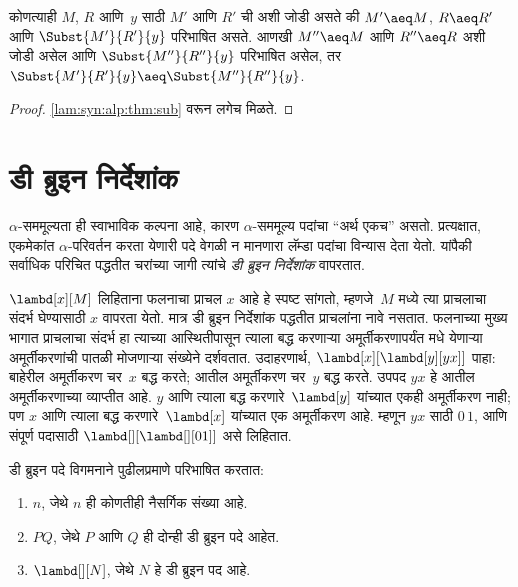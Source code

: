 \begin{cor}\label{lam:syn:alp:cor:sub}
  कोणत्याही $M$, $R$ आणि~$y$ साठी $M'$ आणि $R'$ ची
  अशी जोडी असते की $M' \aeq M$, $R \aeq R'$
  आणि $\Subst{M'}{R'}{y}$ परिभाषित असते. आणखी
  $M'' \aeq M$ आणि $R'' \aeq R$ अशी जोडी असेल
  आणि $\Subst{M''}{R''}{y}$ परिभाषित असेल, तर
  $\Subst{M'}{R'}{y} \aeq
  \Subst{M''}{R''}{y}$.
\end{cor}

\begin{proof}
  \ref{lam:syn:alp:thm:sub} वरून लगेच मिळते.
\end{proof}












\section{डी ब्रुइन निर्देशांक}\label{lam:syn:deb:sec}

$\alpha$-सममूल्यता ही स्वाभाविक कल्पना आहे, कारण
$\alpha$-सममूल्य पदांचा ``अर्थ एकच'' असतो. प्रत्यक्षात,
एकमेकांत $\alpha$-परिवर्तन करता येणारी पदे वेगळी
न मानणारा लॅम्डा पदांचा विन्यास देता येतो. यांपैकी
सर्वाधिक परिचित पद्धतीत चरांच्या जागी त्यांचे
\emph{डी ब्रुइन निर्देशांक} वापरतात.

$\lambd[x][M]$ लिहिताना फलनाचा प्राचल $x$ आहे हे
स्पष्ट सांगतो, म्हणजे~$M$ मध्ये त्या प्राचलाचा संदर्भ
घेण्यासाठी $x$ वापरता येतो. मात्र डी ब्रुइन निर्देशांक
पद्धतीत प्राचलांना नावे नसतात. फलनाच्या मुख्य भागात
प्राचलाचा संदर्भ हा त्याच्या आस्थितीपासून त्याला बद्ध
करणाऱ्या अमूर्तीकरणापर्यंत मधे येणाऱ्या अमूर्तीकरणांची
पातळी मोजणाऱ्या संख्येने दर्शवतात. उदाहरणार्थ,
$\lambd[x][\lambd[y][y x]]$ पाहा: बाहेरील अमूर्तीकरण
चर~$x$ बद्ध करते; आतील अमूर्तीकरण चर~$y$ बद्ध करते.
उपपद $y x$ हे आतील अमूर्तीकरणाच्या व्याप्तीत आहे.
$y$ आणि त्याला बद्ध करणारे~$\lambd[y]$ यांच्यात
एकही अमूर्तीकरण नाही; पण $x$ आणि त्याला बद्ध
करणारे~$\lambd[x]$ यांच्यात एक अमूर्तीकरण आहे.
म्हणून $y x$ साठी $0\, 1$, आणि संपूर्ण पदासाठी
$\lambd[][\lambd[][01]]$ असे लिहितात.

\begin{defn}
  डी ब्रुइन पदे विगमनाने पुढीलप्रमाणे परिभाषित करतात:
  \begin{enumerate}
  \item $n$, जेथे $n$ ही कोणतीही नैसर्गिक संख्या आहे.
  \item $PQ$, जेथे $P$ आणि $Q$ ही दोन्ही डी ब्रुइन पदे आहेत.
  \item $\lambd[][N]$, जेथे $N$ हे डी ब्रुइन पद आहे.
  \end{enumerate}
\end{defn}


